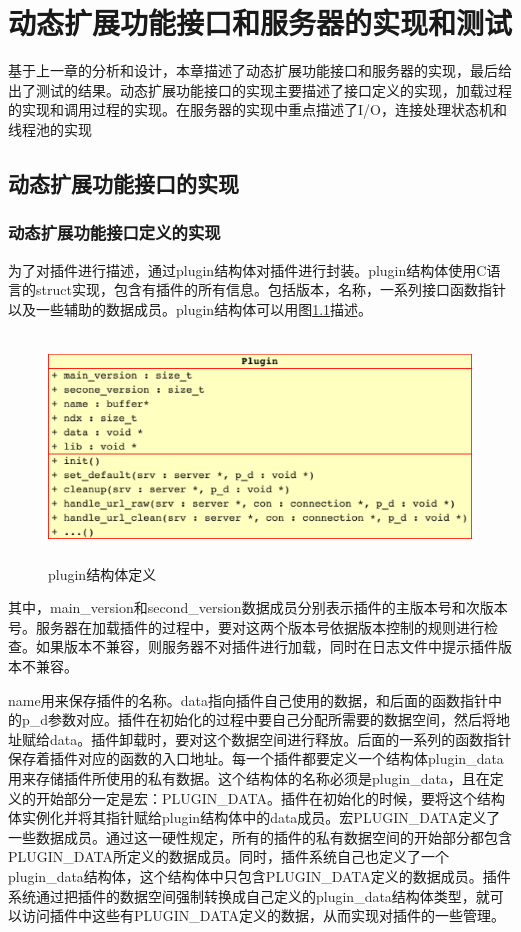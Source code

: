\documentclass[twoside, xetex]{report}
\begin{document}
\chapter{动态扩展功能接口和服务器的实现和测试}

	基于上一章的分析和设计，本章描述了动态扩展功能接口和服务器的实现，最后给出了测试的结果。动态扩展功能接口的实现主要描述了接口定义的实现，加载过程的实现和调用过程的实现。在服务器的实现中重点描述了I/O，连接处理状态机和线程池的实现

\section{动态扩展功能接口的实现}

\subsection{动态扩展功能接口定义的实现}
	为了对插件进行描述，通过plugin结构体对插件进行封装。plugin结构体使用C语言的struct实现，包含有插件的所有信息。包括版本，名称，一系列接口函数指针以及一些辅助的数据成员。plugin结构体可以用图\ref{plugin_s}描述。
	
	\begin{figure}[htbp]
	\centering
	\includegraphics[height=6cm, width=12cm]{pics/plugin_s.eps}
	\caption{plugin结构体定义}
	\label{plugin_s}
	\end{figure}
	
	其中，main\_version和second\_version数据成员分别表示插件的主版本号和次版本号。服务器在加载插件的过程中，要对这两个版本号依据版本控制的规则进行检查。如果版本不兼容，则服务器不对插件进行加载，同时在日志文件中提示插件版本不兼容。
	
	name用来保存插件的名称。data指向插件自己使用的数据，和后面的函数指针中的p\_d参数对应。插件在初始化的过程中要自己分配所需要的数据空间，然后将地址赋给data。插件卸载时，要对这个数据空间进行释放。后面的一系列的函数指针保存着插件对应的函数的入口地址。每一个插件都要定义一个结构体plugin\_data用来存储插件所使用的私有数据。这个结构体的名称必须是plugin\_data，且在定义的开始部分一定是宏：PLUGIN\_DATA。插件在初始化的时候，要将这个结构体实例化并将其指针赋给plugin结构体中的data成员。宏PLUGIN\_DATA定义了一些数据成员。通过这一硬性规定，所有的插件的私有数据空间的开始部分都包含PLUGIN\_DATA所定义的数据成员。同时，插件系统自己也定义了一个plugin\_data结构体，这个结构体中只包含PLUGIN\_DATA定义的数据成员。插件系统通过把插件的数据空间强制转换成自己定义的plugin\_data结构体类型，就可以访问插件中这些有PLUGIN\_DATA定义的数据，从而实现对插件的一些管理。
	
\end{document}
